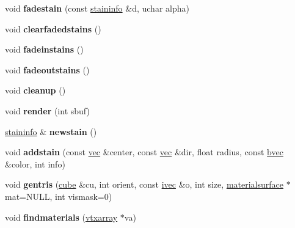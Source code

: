 \begin{DoxyCompactItemize}
\item 
\mbox{\label{structstainrenderer_adf3f8440894207b922aa236a839c1400}} 
void {\bfseries fadestain} (const \hyperlink{structstaininfo}{staininfo} \&d, uchar alpha)
\item 
\mbox{\label{structstainrenderer_a8d9e28267b659e7cdeb38ed2c2dcd336}} 
void {\bfseries clearfadedstains} ()
\item 
\mbox{\label{structstainrenderer_a6fb5c66b095306fbc1bc8d8119f34420}} 
void {\bfseries fadeinstains} ()
\item 
\mbox{\label{structstainrenderer_a12a9293915bbb4b9a45decab078a7685}} 
void {\bfseries fadeoutstains} ()
\item 
\mbox{\label{structstainrenderer_af59f0bd9c2ef9549f4e9dfffc7526ec1}} 
void {\bfseries cleanup} ()
\item 
\mbox{\label{structstainrenderer_a4f15217797fbce8f77a6538f3422ae47}} 
void {\bfseries render} (int sbuf)
\item 
\mbox{\label{structstainrenderer_a216cec6bcfafeedeb554af6c7298d563}} 
\hyperlink{structstaininfo}{staininfo} \& {\bfseries newstain} ()
\item 
\mbox{\label{structstainrenderer_a4ce0c1568040115ecf1d4b1a99740ec9}} 
void {\bfseries addstain} (const \hyperlink{structvec}{vec} \&center, const \hyperlink{structvec}{vec} \&dir, float radius, const \hyperlink{structbvec}{bvec} \&color, int info)
\item 
\mbox{\label{structstainrenderer_a75c14c0a8d7af49a1768b03647b58655}} 
void {\bfseries gentris} (\hyperlink{structcube}{cube} \&cu, int orient, const \hyperlink{structivec}{ivec} \&o, int size, \hyperlink{structmaterialsurface}{materialsurface} $\ast$mat=N\+U\+LL, int vismask=0)
\item 
\mbox{\label{structstainrenderer_a7a9fd8cb7f8733f189f7d52975afa267}} 
void {\bfseries findmaterials} (\hyperlink{structvtxarray}{vtxarray} $\ast$va)

\end{DoxyCompactItemize}
